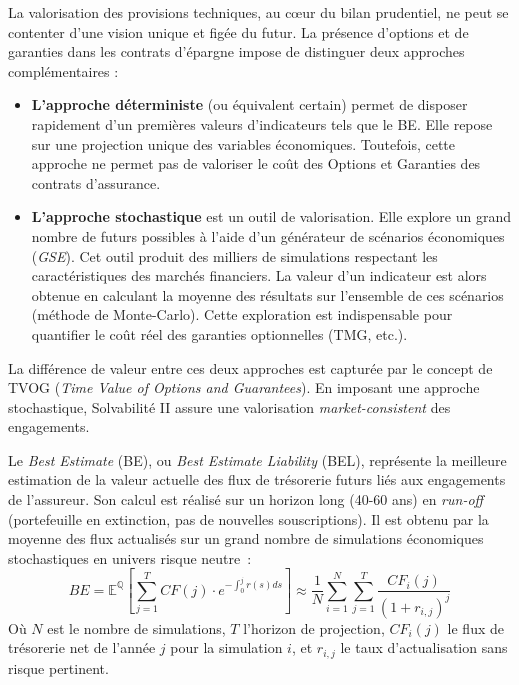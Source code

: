 La valorisation des provisions techniques, au cœur du bilan prudentiel, ne peut se contenter d'une vision unique et figée du futur. La présence d'options et de garanties dans les contrats d'épargne impose de distinguer deux approches complémentaires :
\begin{itemize}
    \item \textbf{L'approche déterministe} (ou équivalent certain) permet de disposer rapidement d'un premières valeurs d'indicateurs tels que le BE. Elle repose sur une projection unique des variables économiques. Toutefois, cette approche ne permet pas de valoriser le coût des Options et Garanties des contrats d'assurance. 
    \item \textbf{L'approche stochastique} est un outil de valorisation. Elle explore un grand nombre de futurs possibles à l'aide d'un générateur de scénarios économiques (\textit{GSE}). Cet outil produit des milliers de simulations respectant les caractéristiques des marchés financiers. La valeur d'un indicateur est alors obtenue en calculant la moyenne des résultats sur l'ensemble de ces scénarios (méthode de Monte-Carlo). Cette exploration est indispensable pour quantifier le coût réel des garanties optionnelles (TMG, etc.).
\end{itemize}
La différence de valeur entre ces deux approches est capturée par le concept de TVOG (\textit{Time Value of Options and Guarantees}). En imposant une approche stochastique, Solvabilité II assure une valorisation \textit{market-consistent} des engagements.


Le \textit{Best Estimate} (BE), ou \textit{Best Estimate Liability} (BEL), représente la meilleure estimation de la valeur actuelle des flux de trésorerie futurs liés aux engagements de l'assureur. Son calcul est réalisé sur un horizon long (40-60 ans) en \textit{run-off} (portefeuille en extinction, pas de nouvelles souscriptions). Il est obtenu par la moyenne des flux actualisés sur un grand nombre de simulations économiques stochastiques en univers risque neutre~:
\begin{equation}
    BE = \mathbb{E}^{\mathbb{Q}} \left[ \sum_{j=1}^{T} CF(j) \cdot e^{-\int_0^j r(s)ds} \right] \approx \frac{1}{N}\sum_{i=1}^{N}\sum_{j=1}^{T}\frac{CF_{i}(j)}{(1+r_{i,j})^{j}}
\end{equation}
Où $N$ est le nombre de simulations, $T$ l'horizon de projection, $CF_{i}(j)$ le flux de trésorerie net de l'année $j$ pour la simulation $i$, et $r_{i,j}$ le taux d'actualisation sans risque pertinent.



